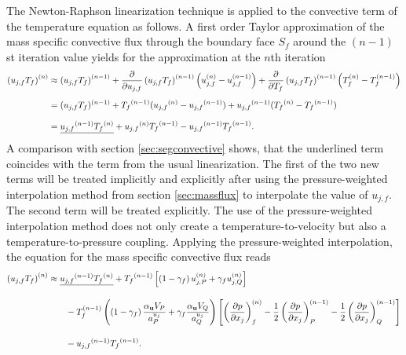 The Newton-Raphson linearization technique is applied to the convective term of the temperature equation as follows. A first order Taylor approximation of the mass specific convective flux through the boundary face \(S_f\) around the \((n-1)\)st iteration value yields for the approximation at the \(n\)th iteration
\begin{align*}
  \left(u_{j,f} T_f \right)^{(n)} 
  &\approx 
  \left(u_{j,f} T_f \right)^{(n-1)} 
  + \frac{\partial}{\partial u_{j,f}}\left( u_{j,f} T_f \right)^{(n-1)} \left(u_{j,f}^{(n)} - u_{j,f}^{(n-1)} \right) 
  + \frac{\partial}{\partial T_f}\left( u_{j,f} T_f \right)^{(n-1)} \left( T_f^{(n)} - T_f^{(n-1)} \right) \\[0.5em]
  &=
  (u_{j,f} T_f )^{(n-1)} 
  + \vphantom{(u_{j,f} T_f)}{T_f}^{(n-1)} (\vphantom{(u_{j,f} T_f)}{u_{j,f}}^{(n)} - \vphantom{(u_{j,f} T_f)}{u_{j,f}}^{(n-1)} ) 
  +  \vphantom{(u_j T)}{u_{j,f}}^{(n-1)} ( \vphantom{(u_j T)}{T_f}^{(n)} - \vphantom{(u_j T)}{T_f}^{(n-1)} ) \\[0.7em]
  &=
  \underline{\vphantom{(u_j T)}{u_{j,f}}^{(n-1)} \vphantom{(u_{j,f})}{T_f}^{(n)}}  + \vphantom{(u_{j,f} T_f)}{u_{j,f}}^{(n)} \vphantom{(u_jT)}{T_f}^{(n-1)}  -  \vphantom{(u_j T)}{u_{j,f}}^{(n-1)} \vphantom{(u_j T)}{T_f}^{(n-1)}.
\end{align*}
A comparison with section \ref{sec:segconvective} shows, that the underlined term coincides with the term from the usual linearization. The first of the two new terms will be treated implicitly and explicitly after using the pressure-weighted interpolation method from section \ref{sec:massflux} to interpolate the value of \(u_{j,f}\). The second term will be treated explicitly. The use of the pressure-weighted interpolation method does not only create a temperature-to-velocity but also a temperature-to-pressure coupling. Applying the pressure-weighted interpolation, the equation for the mass specific convective flux reads
\begin{align*}
  \left(u_{j,f} T_f \right)^{(n)} 
  &\approx 
  \underline{\vphantom{(u_j T)}{u_{j,f}}^{(n-1)} \vphantom{(u_{j,f})}{T_f}^{(n)}} + \vphantom{(u_jT)}{T_f}^{(n-1)}  \left[\left(1 - \gamma_f\right) u_{j,P}^{(n)} + \gamma_f u_{j,Q}^{(n)} \right] \nonumber\\[1em]
    &\quad\quad 
    - T_f^{(n-1)}\left(\left(1 - \gamma_f\right) \frac{\alpha_\vec{u} V_P}{a_P^{u_j}} + \gamma_f \frac{\alpha_\vec{u} V_Q}{a_Q^{u_j}}\right)
    \left[ 
    \left(\frac{\partial p}{\partial x_j}\right)_f^{(n)} 
    -  \frac{1}{2} \left( \frac{\partial p}{\partial x_j} \right)_P^{(n-1)} 
    - \frac{1}{2} \left(\frac{\partial p}{\partial x_j}\right)_Q^{(n-1)} 
    \right] \nonumber \\[1em]
    &  \quad\quad -\vphantom{(u_j T)}{u_{j,f}}^{(n-1)} \vphantom{(u_j T)}{T_f}^{(n-1)}.
\end{align*}
